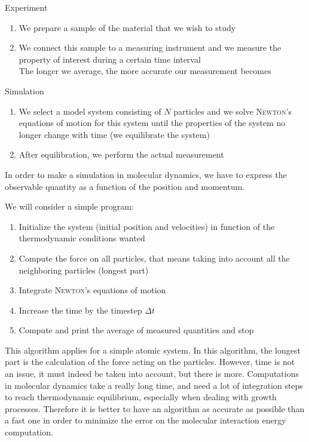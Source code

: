 \setlength{\columnseprule}{0.4pt}
\setlength{\columnsep}{1cm}
\begin{multicols}{2}
    Experiment
    
    \begin{enumerate}
        \item We prepare a sample of the material that we wish to study
        \item We connect this sample to a measuring instrument and we measure the property of interest during a certain time interval\\
          The longer we average, the more accurate our measurement becomes
    \end{enumerate}
    \columnbreak

    Simulation
    
    \begin{enumerate}
        \item We select a model system consisting of $N$ particles and we solve \textsc{Newton}'s equations of motion for this system until the properties of the system no longer change with time (we equilibrate the system)
        \item After equilibration, we perform the actual measurement
    \end{enumerate}
\end{multicols}
In order to make a simulation in molecular dynamics, we have to express the observable quantity as a function of the position and momentum.

We will consider a simple program:
\begin{enumerate}
    \item Initialize the system (initial position and velocities) in function of the thermodynamic conditions wanted
    \item Compute the force on all particles, that means taking into account all the neighboring particles (longest part)
    \item Integrate \textsc{Newton}'s equations of motion
    \item Increase the time by the timestep $\Delta t$
    \item Compute and print the average of measured quantities and stop
\end{enumerate}
This algorithm applies for a simple atomic system. In this algorithm, the longest part is the calculation of the force acting on the particles. However, time is not an issue, it must indeed be taken into account, but there is more. Computations in molecular dynamics take a really long time, and need a lot of integration steps to reach thermodynamic equilibrium, especially when dealing with growth processes. Therefore it is better to have an algorithm as accurate as possible than a fast one in order to minimize the error on the molecular interaction energy computation.

